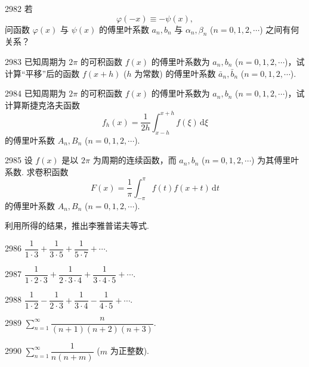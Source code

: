 \begin{prob}[M]{2982}
若
\[
\varphi(-x) \equiv -\psi(x),
\]
问函数 $\varphi(x)$ 与 $\psi(x)$ 的傅里叶系数 $a_n, b_n$ 与 $\alpha_n, \beta_n$ ($n = 0, 1, 2, \cdots$) 之间有何关系？
\end{prob}

\begin{prob}[M]{2983}
已知周期为 $2\pi$ 的可积函数 $f(x)$ 的傅里叶系数为 $a_n, b_n$ ($n = 0, 1, 2, \cdots$)，试计算“平移”后的函数 $f(x+h)$ ($h$ 为常数) 的傅里叶系数 $\bar{a}_n, \bar{b}_n$ ($n = 0, 1, 2, \cdots$).
\end{prob}

\begin{prob}[M]{2984}
已知周期为 $2\pi$ 的可积函数 $f(x)$ 的傅里叶系数为 $a_n, b_n$ ($n = 0, 1, 2, \cdots$)，试计算斯捷克洛夫函数
\[
f_h(x) = \frac{1}{2h} \int_{x-h}^{x+h} f(\xi)\,\mathrm{d}\xi
\]
的傅里叶系数 $A_n, B_n$ ($n = 0, 1, 2, \cdots$).
\end{prob}

\begin{prob}[L]{2985}
设 $f(x)$ 是以 $2\pi$ 为周期的连续函数，而 $a_n, b_n$ ($n = 0, 1, 2, \cdots$) 为其傅里叶系数. 求卷积函数
\[
F(x) = \frac{1}{\pi} \int_{-\pi}^{\pi} f(t)f(x+t)\,\mathrm{d}t
\]
的傅里叶系数 $A_n, B_n$ ($n = 0, 1, 2, \cdots$).

利用所得的结果，推出李雅普诺夫等式.
\end{prob}



\begin{prob}[S]{2986}
$\dfrac{1}{1\cdot 3} + \dfrac{1}{3\cdot 5} + \dfrac{1}{5\cdot 7} + \cdots$.
\end{prob}

\begin{prob}[S]{2987}
$\dfrac{1}{1\cdot 2\cdot 3} + \dfrac{1}{2\cdot 3\cdot 4} + \dfrac{1}{3\cdot 4\cdot 5} + \cdots$.
\end{prob}

\begin{prob}[S]{2988}
$\dfrac{1}{1\cdot 2} - \dfrac{1}{2\cdot 3} + \dfrac{1}{3\cdot 4} - \dfrac{1}{4\cdot 5} + \cdots$.
\end{prob}

\begin{prob}[S]{2989}
$\sum\limits_{n=1}^{\infty} \dfrac{n}{(n+1)(n+2)(n+3)}$.
\end{prob}

\begin{prob}[S]{2990}
$\sum\limits_{n=1}^{\infty} \dfrac{1}{n(n+m)}$ ($m$ 为正整数).
\end{prob}

